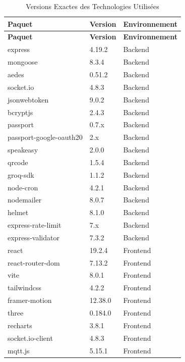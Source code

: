 \begin{center}
\begin{longtable}{lll}
\caption{Versions Exactes des Technologies Utilisées}\label{tab:versions}\\
\toprule
\textbf{Paquet} & \textbf{Version} & \textbf{Environnement} \\
\midrule
\endfirsthead
\toprule
\textbf{Paquet} & \textbf{Version} & \textbf{Environnement} \\
\midrule
\endhead
\bottomrule
\endfoot
express              & 4.19.2  & Backend \\
mongoose             & 8.3.4   & Backend \\
aedes                & 0.51.2  & Backend \\
socket.io            & 4.8.3   & Backend \\
jsonwebtoken         & 9.0.2   & Backend \\
bcryptjs             & 2.4.3   & Backend \\
passport             & 0.7.x   & Backend \\
passport-google-oauth20 & 2.x  & Backend \\
speakeasy            & 2.0.0   & Backend \\
qrcode               & 1.5.4   & Backend \\
groq-sdk             & 1.1.2   & Backend \\
node-cron            & 4.2.1   & Backend \\
nodemailer           & 8.0.7   & Backend \\
helmet               & 8.1.0   & Backend \\
express-rate-limit   & 7.x     & Backend \\
express-validator    & 7.3.2   & Backend \\
react                & 19.2.4  & Frontend \\
react-router-dom     & 7.13.2  & Frontend \\
vite                 & 8.0.1   & Frontend \\
tailwindcss          & 4.2.2   & Frontend \\
framer-motion        & 12.38.0 & Frontend \\
three                & 0.184.0 & Frontend \\
recharts             & 3.8.1   & Frontend \\
socket.io-client     & 4.8.3   & Frontend \\
mqtt.js              & 5.15.1  & Frontend \\

\end{longtable}
\end{center}
